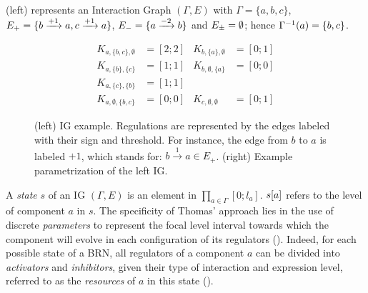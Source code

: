 \begin{example*}
(left) represents an Interaction Graph $(\Gamma,E)$ with
$\Gamma = \{a, b, c\}$,
$E_+ = \{b \xrightarrow{+ 1} a, c \xrightarrow{+ 1} a\}$,
$E_- = \{a \xrightarrow{- 2} b\}$ and
$E_\pm = \emptyset$;
hence $\Gamma^{-1}(a) = \{b, c\}$.
\end{example*}

\begin{figure}[t]
\begin{minipage}{0.4\linewidth}
\centering
{}
\end{minipage}
\begin{minipage}{0.6\linewidth}
\centering
\begin{align*}
K_{a,\{b,c\},\emptyset} &= [2 ; 2] & K_{b,\{a\},\emptyset} &= [0 ; 1] \\
K_{a,\{b\},\{c\}} &= [1 ; 1] & K_{b,\emptyset,\{a\}} &= [0 ; 0] \\
K_{a,\{c\},\{b\}} &= [1 ; 1] &&\\
K_{a,\emptyset,\{b,c\}} &= [0 ; 0] & K_{c,\emptyset,\emptyset} &= [0 ; 1]
\end{align*}
\end{minipage}
\caption{\label{fig:runningBRN}
(left)
IG example.
Regulations are represented by the edges labeled with their sign and threshold.
For instance, the edge from $b$ to $a$ is labeled $+1$, which stands for: $b \xrightarrow{1} a \in
E_+$.
(right)
Example parametrization of the left IG.
}
\end{figure}

A \emph{state} $s$ of an IG $(\Gamma, E)$ is an element in $\prod_{a \in \Gamma} [0;l_a]$.
${s[a]}$ refers to the level of component $a$ in $s$.
The specificity of Thomas' approach lies in the use of discrete \emph{parameters} to represent the
focal level interval towards which the component will evolve in each configuration of its regulators
().
Indeed, for each possible state of a BRN, all regulators of a component $a$ can be divided into
\emph{activators} and \emph{inhibitors}, given their type of interaction and expression level,
referred to as the \emph{resources} of $a$ in this state ().


